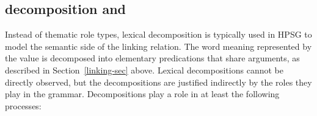 \documentclass[output=paper
 	        ,biblatex
                ,babelshorthands
                ,newtxmath
                ,draftmode
                ,colorlinks, citecolor=brown
]{langscibook}
\begin{document}
%


\subsection{\content decomposition and \argst}

%
%
%

Instead of thematic role types, lexical decomposition is typically used in HPSG to model the semantic side of the linking relation.  The word meaning represented by the \content value is decomposed into elementary predications that share arguments, as described in Section~\ref{linking-sec} above.  Lexical decompositions cannot be directly observed, but the decompositions are justified indirectly by the roles they play in the grammar.  Decompositions play a role in at least the following processes:
\end{document}
